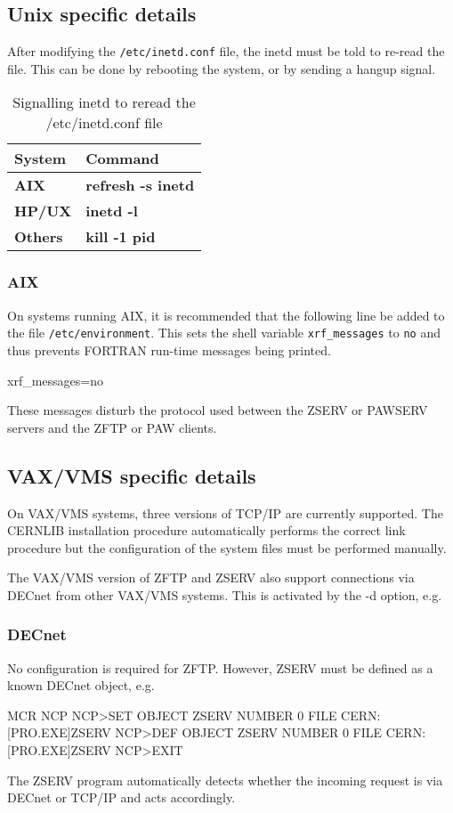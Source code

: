 \subsection{Unix specific details}
\par
After modifying the {\tt /etc/inetd.conf} file, the inetd must
be told to re-read the file. This can be done by rebooting the
system, or by sending a hangup signal.
\begin{table}[h]
\caption{Signalling inetd to reread the /etc/inetd.conf file}
\begin{tabularx}{\textwidth}{|X|X|}
\hline
\bf System   & \bf Command          \\
\hline
\bf AIX      & \bf refresh -s inetd \\
\bf HP/UX    & \bf inetd -l         \\
\bf Others   & \bf kill -1 pid      \\
\hline
\end{tabularx}
\end{table}
\subsubsection{AIX}
On systems running AIX, it is recommended that the following
line be added to the file {\tt /etc/environment}. This sets
the shell variable {\tt xrf\_messages} to {\tt no} and thus
prevents FORTRAN run-time messages being printed.
\begin{XMP}
xrf_messages=no
\end{XMP}

These messages disturb the protocol used between the ZSERV or
PAWSERV servers and the ZFTP or PAW clients.
\subsection{VAX/VMS specific details}
\par
On VAX/VMS systems, three versions of TCP/IP are currently supported.
The CERNLIB installation procedure automatically performs the correct
link procedure but the configuration of the system files must be performed
manually.
\par
The VAX/VMS version of ZFTP and ZSERV also support connections
via DECnet from other VAX/VMS systems. This is activated by
the -d option, e.g.
\subsubsection{DECnet}
\par
No configuration is required for ZFTP. However, ZSERV must be
defined as a known DECnet object, e.g.
\begin{XMP}
MCR NCP
NCP>SET OBJECT ZSERV NUMBER 0 FILE CERN:[PRO.EXE]ZSERV
NCP>DEF OBJECT ZSERV NUMBER 0 FILE CERN:[PRO.EXE]ZSERV
NCP>EXIT
\end{XMP}
\par
The ZSERV program automatically detects whether the incoming
request is via DECnet or TCP/IP and acts accordingly.
